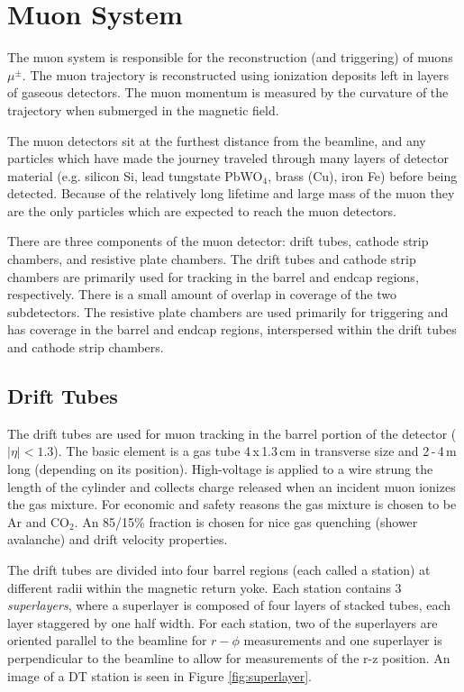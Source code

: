 \section{Muon System}

The muon system is responsible for the reconstruction (and triggering) of muons $\mu^{\pm}$. The muon trajectory is reconstructed using ionization deposits left in layers of gaseous detectors. The muon momentum is measured by the curvature of the trajectory when submerged in the magnetic field.\cite{muontdr}

The muon detectors sit at the furthest distance from the beamline, and any particles which have made the journey traveled through many layers of detector material (e.g. silicon Si, lead tungstate PbWO$_{4}$, brass (Cu), iron Fe) before being detected. Because of the relatively long lifetime and large mass of the muon they are the only particles which are expected to reach the muon detectors.

There are three components of the muon detector: drift tubes, cathode strip chambers, and resistive plate chambers. The drift tubes and cathode strip chambers are primarily used for tracking in the barrel and endcap regions, respectively. There is a small amount of overlap in coverage of the two subdetectors. The resistive plate chambers are used primarily for triggering and has coverage in the barrel and endcap regions, interspersed within the drift tubes and cathode strip chambers.

\subsection{Drift Tubes}

The drift tubes are used for muon tracking in the barrel portion of the detector ($|\eta|<1.3$). The basic element is a gas tube 4$\,$x$\,$1.3$\,$cm in transverse size and 2$\,$-$\,$4$\,$m long (depending on its position). High-voltage is applied to a wire strung the length of the cylinder and collects charge released when an incident muon ionizes the gas mixture. For economic and safety reasons the gas mixture is chosen to be Ar and CO$_{2}$. An 85/15\% fraction is chosen for nice gas quenching (shower avalanche) and drift velocity properties. \cite{dtperformance}

The drift tubes are divided into four barrel regions (each called a station) at different radii within the magnetic return yoke. Each station contains 3 \textit{superlayers}, where a superlayer is composed of four layers of stacked tubes, each layer staggered by one half width. For each station, two of the superlayers are oriented parallel to the beamline for $r-\phi$ measurements and one superlayer is perpendicular to the beamline to allow for measurements of the r-z position. An image of a DT station is seen in Figure \ref{fig:superlayer}.

